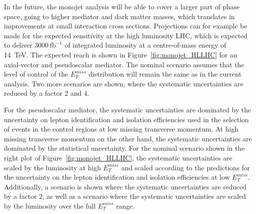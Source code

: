 
In the future, the monojet analysis will be able to cover a larger part of phase space, going to higher mediator and dark matter masses, which translates in improvements at small interaction cross sections. Projections can for example be made for the expected sensitivity at the high luminosity \ac{LHC}, which is expected to deliver $3000\ \mathrm{fb}^{-1}$ of integrated luminosity at a centre-of-mass energy of \SI{14}{TeV}. The expected reach is shown in Figure~\ref{fig:monojet_HLLHC} for an axial-vector and pseudoscalar mediator. 
The nominal scenario assumes that the level of control of the $E_T^{miss}$ distribution will remain the same as in the current analysis. Two more scenarios are shown, where the systematic uncertainties are reduced by a factor 2 and 4. 

For the pseudoscalar mediator, 
the systematic uncertainties are dominated by the uncertainty on lepton identification and isolation efficiencies used in the selection of events in the control regions at low missing transverse momentum. At high missing transverse momentum on the other hand, the systematic uncertainties are dominated by the statistical uncertainty. For the nominal scenario shown in the right plot of Figure~\ref{fig:monojet_HLLHC}, the systematic uncertainties are scaled by the luminosity at high $E_T^{miss}$ and scaled according to the predictions for the uncertainty on the lepton identification and isolation efficiencies at low $E_T^{miss}$. Additionally, a scenario is shown where the systematic uncertainties are reduced by a factor 2, as well as a scenario where the systematic uncertainties are scaled by the luminosity over the full $E_T^{miss}$ range.

